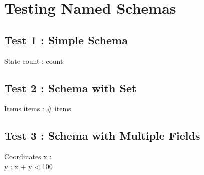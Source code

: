 \documentclass[a4paper,10pt,fleqn]{article}
\begin{document}
\section*{Testing Named Schemas}

\subsection*{Test 1 : Simple Schema}

\begin{schema}{State}
count : \nat
\where
count 
\end{schema}

\subsection*{Test 2 : Schema with Set}

\begin{schema}{Items}
items : \power \nat
\where
\# items 
\end{schema}

\subsection*{Test 3 : Schema with Multiple Fields}

\begin{schema}{Coordinates}
x : \nat \\
y : \nat
\where
x + y < 100
\end{schema}
\end{document}
